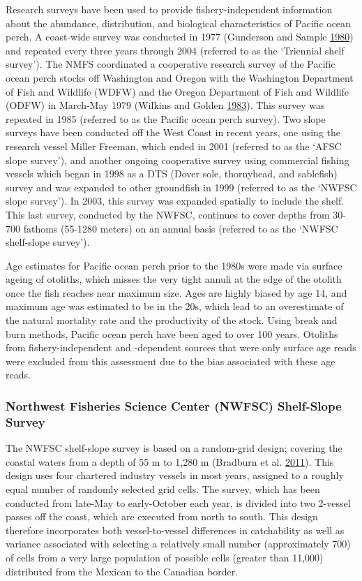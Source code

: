 \documentclass[12pt,]{article}
\begin{document}
Research surveys have been used to provide fishery-independent
information about the abundance, distribution, and biological
characteristics of Pacific ocean perch. A coast-wide survey was
conducted in 1977 (Gunderson and Sample
\protect\hyperlink{ref-gunderson_distribution_1980}{1980}) and repeated
every three years through 2004 (referred to as the `Triennial shelf
survey'). The NMFS coordinated a cooperative research survey of the
Pacific ocean perch stocks off Washington and Oregon with the Washington
Department of Fish and Wildlife (WDFW) and the Oregon Department of Fish
and Wildlife (ODFW) in March-May 1979 (Wilkins and Golden
\protect\hyperlink{ref-wilkins_condition_1983}{1983}). This survey was
repeated in 1985 (referred to as the Pacific ocean perch survey). Two
slope surveys have been conducted off the West Coast in recent years,
one using the research vessel Miller Freeman, which ended in 2001
(referred to as the `AFSC slope survey'), and another ongoing
cooperative survey using commercial fishing vessels which began in 1998
as a DTS (Dover sole, thornyhead, and sablefish) survey and was expanded
to other groundfish in 1999 (referred to as the `NWFSC slope survey').
In 2003, this survey was expanded spatially to include the shelf. This
last survey, conducted by the NWFSC, continues to cover depths from
30-700 fathoms (55-1280 meters) on an annual basis (referred to as the
`NWFSC shelf-slope survey').

Age estimates for Pacific ocean perch prior to the 1980s were made via
surface ageing of otoliths, which misses the very tight annuli at the
edge of the otolith once the fish reaches near maximum size. Ages are
highly biased by age 14, and maximum age was estimated to be in the 20s,
which lead to an overestimate of the natural mortality rate and the
productivity of the stock. Using break and burn methods, Pacific ocean
perch have been aged to over 100 years. Otoliths from
fishery-independent and -dependent sources that were only surface age
reads were excluded from this assessment due to the bias associated with
these age reads.

\subsubsection{Northwest Fisheries Science Center (NWFSC) Shelf-Slope
Survey}\label{northwest-fisheries-science-center-nwfsc-shelf-slope-survey}

The NWFSC shelf-slope survey is based on a random-grid design; covering
the coastal waters from a depth of 55 m to 1,280 m (Bradburn et al.
\protect\hyperlink{ref-bradburn_2003_2011}{2011}). This design uses four
chartered industry vessels in most years, assigned to a roughly equal
number of randomly selected grid cells. The survey, which has been
conducted from late-May to early-October each year, is divided into two
2-vessel passes off the coast, which are executed from north to south.
This design therefore incorporates both vessel-to-vessel differences in
catchability as well as variance associated with selecting a relatively
small number (approximately 700) of cells from a very large population
of possible cells (greater than 11,000) distributed from the Mexican to
the Canadian border.
\end{document}
